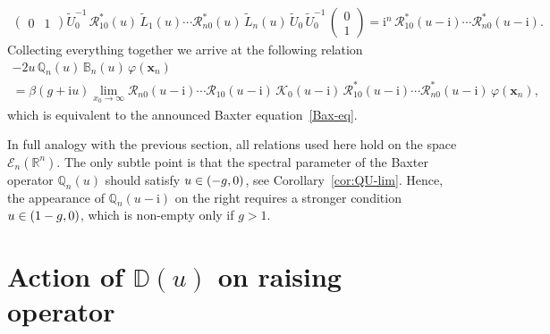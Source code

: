 \documentclass[11pt]{article}
\numberwithin{equation}{section}
\theoremstyle{plain}
\theoremstyle{definition}
\newcommand{\B}{\mathbb{B}}
\newcommand{\D}{\mathbb{D}}
\newcommand{\QQ}{\mathbb{Q}}
\let\Im\relax
\DeclareMathOperator{\Im}{Im}
\renewcommand{\phi}{\varphi}
\renewcommand{\imath}{\mathrm{i}}
\begin{document}
\begin{align}
	\begin{pmatrix}
	0 & 1
	\end{pmatrix} 
\widetilde{U}^{-1}_0 \,\mathcal{R}^*_{10}(u) \, 
\widetilde{L}_1(u)  \cdots 
\mathcal{R}^*_{n0}(u) \, 
\widetilde{L}_n(u) \, \widetilde{U}_0 \,\widetilde{U}^{-1}_0\,
\begin{pmatrix}
 0 \\
1
\end{pmatrix}
=  \imath^n\,\mathcal{R}^*_{10}(u-\imath)\cdots\mathcal{R}^*_{n0}(u-\imath).
\end{align}
Collecting everything together we arrive at the following relation 
\begin{multline}
-2u\,\QQ_n(u)\,\B_n(u) \, \phi(\bm{x}_n) \\[6pt]
= \beta (g + \imath u) \lim_{x_{0} \to \infty} \mathcal{R}_{n0}(u-\imath)\cdots\mathcal{R}_{10}(u-\imath) \, \mathcal{K}_0(u-\imath) \,\mathcal{R}^*_{10}(u-\imath)\cdots\mathcal{R}^*_{n0}(u-\imath) \, \phi(\bm{x}_n)  ,
\end{multline}
which is equivalent to the announced Baxter equation~\eqref{Bax-eq}.

In full analogy with the previous section, all relations used here hold on the space $\mathcal{E}_n(\mathbb{R}^n)$. The only subtle point is that the spectral parameter of the Baxter operator $\QQ_n(u)$ should satisfy $\Im u \in (-g, 0)$, see Corollary~\ref{cor:QU-lim}. Hence, the appearance of $\QQ_n(u - \imath)$ on the right requires a stronger condition $\Im u \in (1 - g, 0)$, which is non-empty only if $g > 1$.

\section{Action of $\D(u)$ on raising operator} \label{sec:DL}
\end{document}
